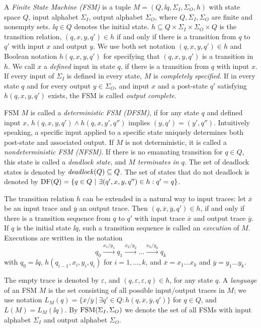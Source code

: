 A \emph{Finite State Machine (FSM)} is  a tuple
 $M=(Q, \ii{q}, \Sigma_I, \Sigma_O,  h)$   with state space $Q$, input alphabet $\Sigma_I$, 
 output alphabet $\Sigma_O$, where $Q,\Sigma_I,\Sigma_O$ are finite and nonempty sets. $\ii{q}\in Q$ denotes the initial state. 
$h\subseteq Q\times \Sigma_I \times \Sigma_O\times Q$ is the  transition relation,  $(q,x,y,q')\in h$ if and only if there is a transition from $q$ to $q'$ with input $x$ and output $y$. 
We use  both set notation $(q,x,y,q')\in h$ and Boolean notation $h(q,x,y,q')$ for specifying
that $(q,x,y,q')$ is a transition in $h$.
We call $x$ a \emph{defined} input in state $q$, if there is a transition from $q$  with input $x$. 
If every input of $\Sigma_I$ is defined in every state, $M$ is \emph{completely specified}.
If in every state $q$ and for every output $y\in\Sigma_O$, and input $x$ and a post-state 
$q'$ satisfying $h(q,x,y,q')$ exists, the FSM is called \emph{output complete}.


FSM $M$ is called a \emph{deterministic FSM (DFSM)}, if for any state $q$ and defined input $x$,
$h(q,x,y,q') \wedge h(q,x,y',q'')$ implies $(y,q') = (y',q'')$. Intuitively speaking, a specific 
input applied to a specific state uniquely determines both post-state and associated output.
If $M$ is not deterministic, it is called a \emph{nondeterministic FSM (NFSM)}.  
If there is no emanating transition for $q\in Q$, this state is called a \emph{deadlock state}, and
\emph{$M$ terminates in $q$}. The set of deadlock states is denoted by ${\it deadlock}(Q)\subseteq Q$. 
The set of states that do not deadlock is denoted by 
$\text{DF}(Q) = \{ q\in Q~|~\exists (q',x,y,q'')\in h: q' = q \}$.

 
The transition relation $h$ can be extended in a natural way to input traces:  
let $\overline{x}$ be an input trace and $\overline{y}$ an output trace. Then 
$(q,\overline{x},\overline{y},q')\in h$, if and only if there is a transition sequence
from $q$ to $q'$ with input trace $\overline{x}$ and output trace $\overline{y}$. 
If $q$ is the initial state $\ii{q}$, such a transition sequence is called an \emph{execution} of $M$. Executions are written in the notation 
$$
q_0 \xrightarrow{x_1/y_1} q_1 \xrightarrow{x_2/y_2} \dots \xrightarrow{x_{k}/y_{k}} q_{k}
$$ 
with $q_0 = \ii{q}$, $h(q_{i-1},x_i,y_i,q_{i})$ for $i = 1,\dots,k$, and
$\overline{x} = x_1\dots x_k$ and $\overline{y} = y_1\dots y_k$.

The empty trace is denoted by $\varepsilon$, and
$(q,\varepsilon,\varepsilon,q)\in h$, for any state $q$.
A \emph{language}  of an FSM $M$  is the set consisting of all possible input/output
traces in $M$; we use notation
 $L_M(q)=\{\overline{x}/\overline{y}~|~\exists q'\in Q: h(q,\overline{x},\overline{y},q')\}$ for $q\in Q$, and  $L(M)=L_M(\ii{q})$.
By $\text{FSM}(\Sigma_I,\Sigma_O)$ we denote the set of all FSMs with input alphabet $\Sigma_I$ and
output alphabet $\Sigma_O$.

